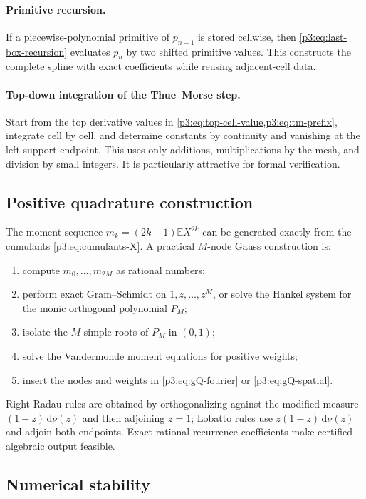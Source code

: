 \documentclass[11pt,oneside]{article}
\numberwithin{equation}{section}
\theoremstyle{definition}
\theoremstyle{remark}
\newcommand{\E}{\mathbb E}
\newcommand{\dd}{\,\mathrm d}
\begin{document}
\paragraph{Primitive recursion.}
If a piecewise-polynomial primitive of $p_{n-1}$ is stored cellwise, then
\cref{p3:eq:last-box-recursion} evaluates $p_n$ by two shifted primitive values.  This
constructs the complete spline with exact coefficients while reusing adjacent-cell data.

\paragraph{Top-down integration of the Thue--Morse step.}
Start from the top derivative values in \cref{p3:eq:top-cell-value,p3:eq:tm-prefix}, integrate
cell by cell, and determine constants by continuity and vanishing at the left support
endpoint.  This uses only additions, multiplications by the mesh, and division by small
integers.  It is particularly attractive for formal verification.

\subsection{Positive quadrature construction}

The moment sequence $m_k=(2k+1)\E X^{2k}$ can be generated exactly from the cumulants
\cref{p3:eq:cumulants-X}.  A practical $M$-node Gauss construction is:
\begin{enumerate}[leftmargin=2.1em]
\item compute $m_0,\ldots,m_{2M}$ as rational numbers;
\item perform exact Gram--Schmidt on $1,z,\ldots,z^M$, or solve the Hankel system for
      the monic orthogonal polynomial $P_M$;
\item isolate the $M$ simple roots of $P_M$ in $(0,1)$;
\item solve the Vandermonde moment equations for positive weights;
\item insert the nodes and weights in \cref{p3:eq:gQ-fourier} or
      \cref{p3:eq:gQ-spatial}.
\end{enumerate}
Right-Radau rules are obtained by orthogonalizing against the modified measure
$(1-z)\dd\nu(z)$ and then adjoining $z=1$; Lobatto rules use
$z(1-z)\dd\nu(z)$ and adjoin both endpoints.  Exact rational recurrence coefficients
make certified algebraic output feasible.

\subsection{Numerical stability}
\end{document}
